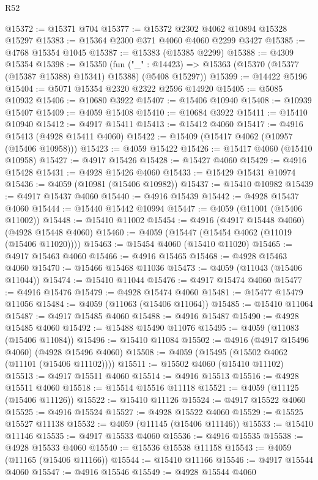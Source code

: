 \begin{lexlean}{R52}
\begin{coremodule}
@15372 := @15371 @704
@15377 := @15372 @2302 @4062 @10894 @15328 @15297
@15383 := @15364 @2300 @371 @4060 @4060 @2299 @3427
@15385 := @4768 @15354 @1045
@15387 := @15383 (@15385 @2299)
@15388 := @4309 @15354
@15398 := @15350
    (fun ("_" : @14423) => @15363 (@15370 (@15377 (@15387 @15388) @15341) @15388) (@5408 @15297))
@15399 := @14422 @5196
@15404 := @5071 @15354 @2320 @2322 @2596 @14920
@15405 := @5085 @10932
@15406 := @10680 @3922
@15407 := @15406 @10940
@15408 := @10939 @15407
@15409 := @4059 @15408
@15410 := @10684 @3922
@15411 := @15410 @10940
@15412 := @4917 @15411
@15413 := @15412 @4060
@15417 := @4916 @15413 (@4928 @15411 @4060)
@15422 := @15409 (@15417 @4062 (@10957 (@15406 @10958)))
@15423 := @4059 @15422
@15426 := @15417 @4060 (@15410 @10958)
@15427 := @4917 @15426
@15428 := @15427 @4060
@15429 := @4916 @15428
@15431 := @4928 @15426 @4060
@15433 := @15429 @15431 @10974
@15436 := @4059 (@10981 (@15406 @10982))
@15437 := @15410 @10982
@15439 := @4917 @15437 @4060
@15440 := @4916 @15439
@15442 := @4928 @15437 @4060
@15444 := @15440 @15442 @10994
@15447 := @4059 (@11001 (@15406 @11002))
@15448 := @15410 @11002
@15454 := @4916 (@4917 @15448 @4060) (@4928 @15448 @4060)
@15460 := @4059 (@15447 (@15454 @4062 (@11019 (@15406 @11020))))
@15463 := @15454 @4060 (@15410 @11020)
@15465 := @4917 @15463 @4060
@15466 := @4916 @15465
@15468 := @4928 @15463 @4060
@15470 := @15466 @15468 @11036
@15473 := @4059 (@11043 (@15406 @11044))
@15474 := @15410 @11044
@15476 := @4917 @15474 @4060
@15477 := @4916 @15476
@15479 := @4928 @15474 @4060
@15481 := @15477 @15479 @11056
@15484 := @4059 (@11063 (@15406 @11064))
@15485 := @15410 @11064
@15487 := @4917 @15485 @4060
@15488 := @4916 @15487
@15490 := @4928 @15485 @4060
@15492 := @15488 @15490 @11076
@15495 := @4059 (@11083 (@15406 @11084))
@15496 := @15410 @11084
@15502 := @4916 (@4917 @15496 @4060) (@4928 @15496 @4060)
@15508 := @4059 (@15495 (@15502 @4062 (@11101 (@15406 @11102))))
@15511 := @15502 @4060 (@15410 @11102)
@15513 := @4917 @15511 @4060
@15514 := @4916 @15513
@15516 := @4928 @15511 @4060
@15518 := @15514 @15516 @11118
@15521 := @4059 (@11125 (@15406 @11126))
@15522 := @15410 @11126
@15524 := @4917 @15522 @4060
@15525 := @4916 @15524
@15527 := @4928 @15522 @4060
@15529 := @15525 @15527 @11138
@15532 := @4059 (@11145 (@15406 @11146))
@15533 := @15410 @11146
@15535 := @4917 @15533 @4060
@15536 := @4916 @15535
@15538 := @4928 @15533 @4060
@15540 := @15536 @15538 @11158
@15543 := @4059 (@11165 (@15406 @11166))
@15544 := @15410 @11166
@15546 := @4917 @15544 @4060
@15547 := @4916 @15546
@15549 := @4928 @15544 @4060

\end{coremodule}
\end{lexlean}

